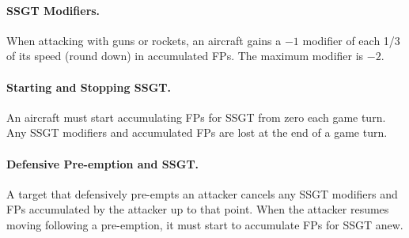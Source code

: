 \begin{advancedrules}
{\paragraph{SSGT Modifiers.} When attacking with guns or rockets, an aircraft gains a $-1$ modifier of each 1/3 of its speed (round down) in accumulated FPs. The maximum modifier is $-2$. 

\paragraph{Starting and Stopping SSGT.}
An aircraft must start accumulating FPs for SSGT from zero each game turn. Any SSGT modifiers and accumulated FPs are lost at the end of a game turn. 

\paragraph{Defensive Pre-emption and SSGT.}
A target that defensively pre-empts an attacker cancels any SSGT modifiers and FPs accumulated by the attacker up to that point. When the attacker resumes moving following a pre-emption, it must start to accumulate FPs for SSGT anew.

}




\end{advancedrules}

